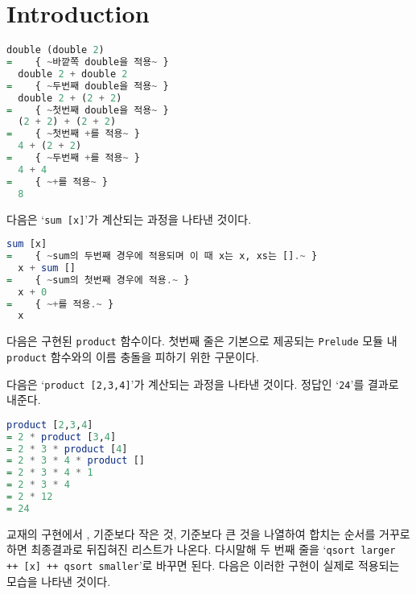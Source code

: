 \chapter{\Large{Introduction}}


\begin{lstlisting}[language=Haskell,escapeinside=~~]
  double (double 2)
=    { ~바깥쪽 double을 적용~ }
  double 2 + double 2
=    { ~두번째 double을 적용~ }
  double 2 + (2 + 2)
=    { ~첫번째 double을 적용~ }
  (2 + 2) + (2 + 2)
=    { ~첫번째 +를 적용~ }
  4 + (2 + 2)
=    { ~두번째 +를 적용~ }
  4 + 4
=    { ~+를 적용~ }
  8
\end{lstlisting}


다음은 `\texttt{sum [x]}'가 계산되는 과정을 나타낸 것이다.

\begin{lstlisting}[language=Haskell,escapeinside=~~]
  sum [x]
=    { ~sum의 두번째 경우에 적용되며 이 때 x는 x, xs는 [].~ }
  x + sum []
=    { ~sum의 첫번째 경우에 적용.~ }
  x + 0
=    { ~+를 적용.~ }
  x
\end{lstlisting}


다음은 구현된 \texttt{product} 함수이다. 첫번째 줄은  기본으로 제공되는
\texttt{Prelude} 모듈 내 \texttt{product} 함수와의 이름 충돌을 피하기 위한
구문이다.


다음은 `\texttt{product [2,3,4]}'가 계산되는 과정을 나타낸 것이다. 정답인
`\texttt{24}'를 결과로 내준다.

\begin{lstlisting}[language=Haskell]
  product [2,3,4]
= 2 * product [3,4]
= 2 * 3 * product [4]
= 2 * 3 * 4 * product []
= 2 * 3 * 4 * 1
= 2 * 3 * 4
= 2 * 12
= 24
\end{lstlisting}


교재의 구현에서 , 기준보다 작은 것, 기준보다 큰 것을
나열하여 합치는 순서를 거꾸로 하면 최종결과로 뒤집혀진 리스트가
나온다. 다시말해 두 번째 줄을 `\texttt{qsort larger ++ [x] ++ qsort
  smaller}'로 바꾸면 된다. 다음은 이러한 구현이 실제로 적용되는 모습을
나타낸 것이다.

